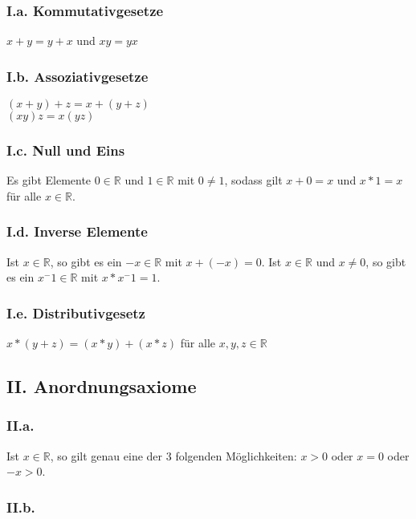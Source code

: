 \documentclass[a4paper,10pt]{article}
\begin{document}
\subsubsection{I.a. Kommutativgesetze}

$x + y = y + x$ und $xy = yx$

\subsubsection{I.b. Assoziativgesetze}

$(x + y) + z = x + (y + z)$\\
$(xy)z = x(yz)$

\subsubsection{I.c. Null und Eins}

Es gibt Elemente $0 \in \mathbb{R}$ und $1 \in \mathbb{R}$ mit $0 \ne 1$, sodass gilt $x + 0 = x$ und $x * 1 = x$ für alle
$x \in \mathbb{R}$.

\subsubsection{I.d. Inverse Elemente}

Ist $x \in \mathbb{R}$, so gibt es ein $-x \in \mathbb{R}$ mit $x + (-x) = 0$. Ist $x \in \mathbb{R}$ und $x \ne 0$, so gibt es
ein $x^-1 \in \mathbb{R}$ mit $x * x^-1 = 1$.

\subsubsection{I.e. Distributivgesetz}

$x * (y + z) = (x * y) + (x * z)$ für alle $x, y, z \in \mathbb{R}$

\subsection{II. Anordnungsaxiome}

\subsubsection{II.a.}

Ist $x \in \mathbb{R}$, so gilt genau eine der 3 folgenden Möglichkeiten: $x > 0$ oder $x = 0$ oder $-x > 0$.

\subsubsection{II.b.}
\end{document}
